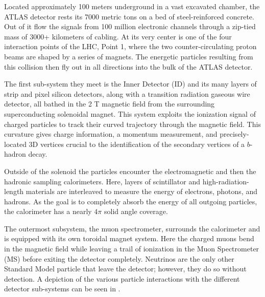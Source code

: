 Located approximately 100 meters underground in a vast excavated chamber, the
ATLAS detector rests its 7000 metric tons on a bed of steel-reinforced
concrete.  Out of it flow the signals from 100 million electronic channels
through a zip-tied mass of 3000+ kilometers of cabling.  At its very center is
one of the four interaction points of the LHC, Point 1, where the
two counter-circulating proton beams are shaped by a
series of magnets.  The energetic particles resulting from this collision then
fly out in all directions into the bulk of the ATLAS detector.

The first sub-system they meet is the Inner Detector (ID) and its many layers
of strip and pixel silicon detectors, along with a transition radiation gaseous
wire detector, all bathed in the 2 T magnetic field from the surrounding
superconducting solenoidal magnet.  This system exploits the ionization signal
of charged particles to track their curved trajectory through the magnetic
field.  This curvature gives charge information, a momentum measurement, and
precisely-located 3D vertices crucial to the identification of the secondary
vertices of a $b$-hadron decay. 

Outside of the solenoid the particles encounter the electromagnetic and then
the hadronic sampling calorimeters. Here, layers of scintillator and
high-radiation-length materials are interleaved to measure the energy of
electrons, photons, and hadrons. As the goal is to completely absorb the energy
of all outgoing particles, the calorimeter has a nearly $4\pi$ solid angle
coverage.

The outermost subsystem, the muon spectrometer, surrounds the calorimeter and
is equipped with its own toroidal magnet system.  Here the charged muons bend
in the magnetic field while leaving a trail of ionization in the Muon
Spectrometer (MS) before exiting the detector completely.  Neutrinos are the
only other Standard Model particle that leave the detector; however, they do so
without detection.  A depiction of the various particle interactions with the
different detector sub-systems can be seen in .


